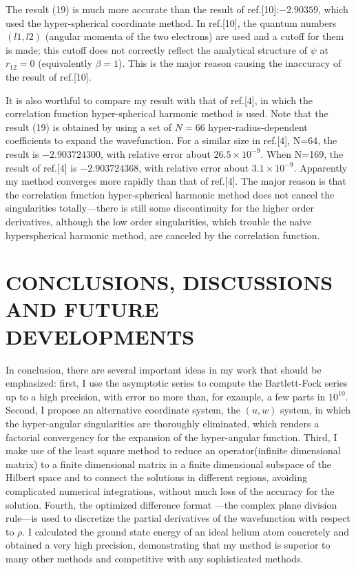The result (19) is much more accurate than the result
of ref.[10]:$-2.90359$, which
used the hyper-spherical coordinate method.
In ref.[10], the quantum numbers $(l1,l2)$
(angular momenta of the two electrons) are used and a cutoff for them
is made; this cutoff does not correctly reflect the analytical
structure of $\psi$ at $r_{12}=0$ (equivalently $\beta=1$). This is the major
reason causing the inaccuracy of the result of ref.[10].

It is also worthful to compare my result with that of ref.[4], in which
the correlation function hyper-spherical harmonic method is used. Note that
the result (19) is obtained by using a set of $N=66$
hyper-radius-dependent coefficients to expand the wavefunction. For a similar
size in ref.[4], N=64, the result is $-2.903724300$, with relative error
about $26.5\times 10^{-9}$. When N=169, the result of ref.[4] is
$-2.903724368$, with relative error about $3.1\times 10^{-9}$. Apparently
my method converges more rapidly than that of ref.[4]. The major reason
is that the correlation function hyper-spherical harmonic method does not
cancel the singularities totally---there is still some discontinuity
for the higher order derivatives, although the low order singularities,
which trouble the naive hyperspherical harmonic method, are canceled by
the correlation function.

\section{CONCLUSIONS, DISCUSSIONS AND FUTURE DEVELOPMENTS}

In conclusion, there are several important ideas in my work that
should be emphasized: first, I use the asymptotic series to compute
the Bartlett-Fock series up to a high precision, with error no more than,
for example, a few parts in $10^{10}$. Second, I propose an alternative
coordinate system, the $(u,w)$ system, in which the hyper-angular
singularities are thoroughly eliminated, which renders a factorial
convergency for the expansion of the hyper-angular function. Third,
I make use of the least square method to reduce an operator(infinite
dimensional matrix) to a finite dimensional matrix in a finite dimensional
subspace of the Hilbert space and to connect the solutions in different
regions, avoiding complicated numerical integrations, without much loss
of the accuracy for the solution. Fourth, the optimized difference format
---the complex plane division rule---is used to discretize the partial
derivatives of the wavefunction with respect to $\rho$. I calculated the
ground state energy of an ideal helium atom concretely and obtained a very
high precision, demonstrating that my method is superior to many other
methods and competitive with any sophisticated methods.

